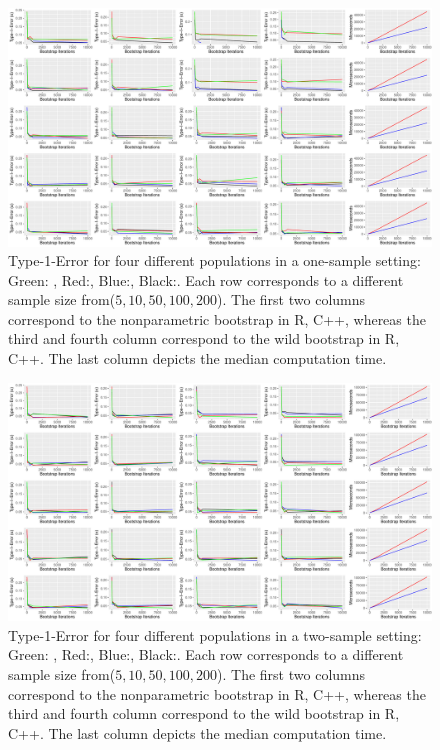 \begin{figure}\label{fig:t1_s1}
	\includegraphics[scale=0.3]{./figures/plot_t1s1.pdf}
	\caption[Type-I-Error One Sample]{Type-1-Error for four different populations in a one-sample setting: Green: , Red:, Blue:, Black:. Each row corresponds to a different sample size from($5, 10, 50, 100, 200$). The first two columns correspond to the nonparametric bootstrap in R, C++, whereas the third and fourth column correspond to the wild bootstrap in R, C++. The last column depicts the median computation time.}
\end{figure}


\begin{figure}\label{fig:t1_s2}
	\includegraphics[scale=0.3]{./figures/plot_t1s2.pdf}
	\caption[Type-I-Error Two Sample]{Type-1-Error for four different populations in a two-sample setting: Green: , Red:, Blue:, Black:. Each row corresponds to a different sample size from($5, 10, 50, 100, 200$). The first two columns correspond to the nonparametric bootstrap in R, C++, whereas the third and fourth column correspond to the wild bootstrap in R, C++. The last column depicts the median computation time.}
\end{figure}